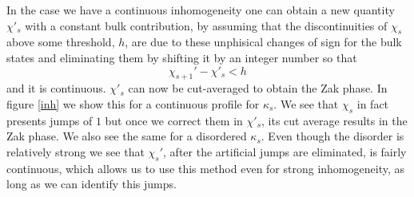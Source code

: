 \documentclass[twocolumn,amsmath,longbibliography,amssymb,superscriptaddress]{revtex4-1}
\begin{document}
In the case we have a continuous inhomogeneity one can obtain a new quantity $\chi'_s$ with a constant bulk contribution, by assuming that the discontinuities of $\chi_s$ above some threshold, $h$, are due to these unphisical changes of sign for the bulk states and eliminating them by shifting it by an integer number so that
\begin{equation}
\chi_{s+1}'-\chi'_s < h
\end{equation}
and it is continuous. $\chi'_s$ can now be cut-averaged to obtain the Zak phase. In figure \ref{inh} we show this for a continuous profile for $\kappa_s$. We see that $\chi_s$ in fact presents jumps of $1$ but once we correct them in $\chi'_s$, its cut average results in the Zak phase. We also see the same for a disordered $\kappa_s$. Even though the disorder is relatively strong we see that $\chi_s'$, after the artificial jumps are eliminated, is fairly continuous, which allows us to use this method even for strong inhomogeneity, as long as we can identify this jumps. 
\end{document}
